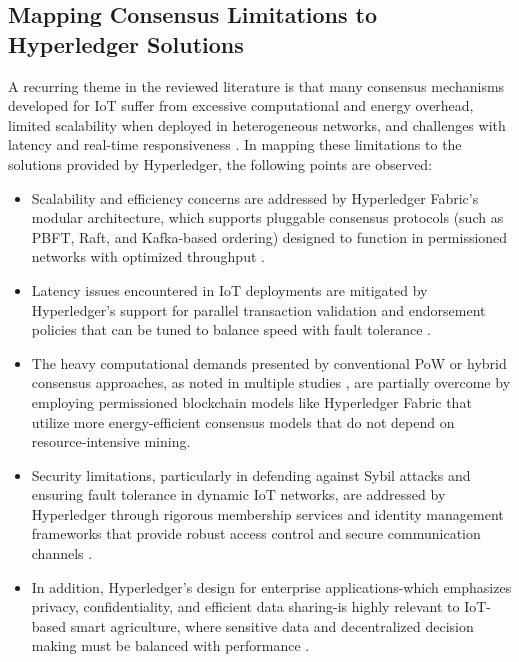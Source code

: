 \documentclass[12pt,onecolumn]{IEEEtran} %
\begin{document}
  \subsection{Mapping Consensus Limitations to Hyperledger Solutions}\label{subsec:consensus-to-hl}
A recurring theme in the reviewed literature is that many consensus mechanisms developed for IoT suffer from excessive computational and energy overhead, limited scalability when deployed in heterogeneous networks, and challenges with latency and real-time responsiveness \cite{ali2022blockchainenabledarchitecture, bryant2022keychallengesin, guo2022ahierarchicaland}. In mapping these limitations to the solutions provided by Hyperledger, the following points are observed:
\begin{itemize}
    \item Scalability and efficiency concerns are addressed by Hyperledger Fabric's modular architecture, which supports pluggable consensus protocols (such as PBFT, Raft, and Kafka-based ordering) designed to function in permissioned networks with optimized throughput \cite{khan2022asurveyand, bryant2022keychallengesin}.
    \item Latency issues encountered in IoT deployments are mitigated by Hyperledger's support for parallel transaction validation and endorsement policies that can be tuned to balance speed with fault tolerance \cite{morais2023surveyonintegration, ali2022blockchainenabledarchitecture}.
    \item The heavy computational demands presented by conventional PoW or hybrid consensus approaches, as noted in multiple studies \cite{ali2022blockchainenabledarchitecture, bryant2022keychallengesin}, are partially overcome by employing permissioned blockchain models like Hyperledger Fabric that utilize more energy-efficient consensus models that do not depend on resource-intensive mining.
    \item Security limitations, particularly in defending against Sybil attacks and ensuring fault tolerance in dynamic IoT networks, are addressed by Hyperledger through rigorous membership services and identity management frameworks that provide robust access control and secure communication channels \cite{guru2023asurveyon, platt2023sybilinthe}.
    \item In addition, Hyperledger's design for enterprise applications-which emphasizes privacy, confidentiality, and efficient data sharing-is highly relevant to IoT-based smart agriculture, where sensitive data and decentralized decision making must be balanced with performance \cite{khan2022asurveyand, haque2024ascalableblockchain}.
\end{itemize}
\end{document}
